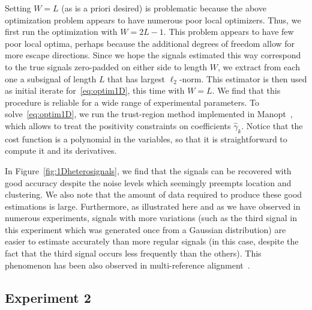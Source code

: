 \documentclass[12pt]{article}
\newcommand{\1}{\mathbf{1}}
\theoremstyle{plain}
\theoremstyle{definition}
\theoremstyle{remark}
\theoremstyle{plain}
\theoremstyle{remark}
\theoremstyle{plain}
\theoremstyle{plain}
\theoremstyle{plain}
\numberwithin{equation}{section}
\begin{document}
Setting $W = L$ (as is a priori desired) is problematic because the above optimization problem appears to have numerous poor local optimizers. Thus, we first run the optimization with $W = 2L-1$. This problem appears to have few poor local optima, perhaps because the additional degrees of freedom allow for more escape directions. Since we hope the signals estimated this way correspond to the true signals zero-padded on either side to length $W$, we extract from each one a subsignal of length $L$ that has largest $\ell_2$-norm. This estimator is then used as initial iterate for~\eqref{eq:optim1D}, this time with $W = L$. We find that this procedure is reliable for a wide range of experimental parameters. To solve~\eqref{eq:optim1D}, we run the trust-region method implemented in Manopt~\cite{manopt}, which allows to treat the positivity constraints on coefficients $\hat \gamma_k$. Notice that the cost function is a polynomial in the variables, so that it is straightforward to compute it and its derivatives.

In Figure~\ref{fig:1Dheterosignals}, we find that the signals can be recovered with good accuracy despite the noise levels which seemingly preempts location and clustering. We also note that the amount of data required to produce these good estimations is large. Furthermore, as illustrated here and as we have observed in numerous experiments, signals with more variations (such as the third signal in this experiment which was generated once from a Gaussian distribution) are easier to estimate accurately than more regular signals (in this case, despite the fact that the third signal occurs less frequently than the others).
This phenomenon has been also observed in multi-reference alignment~\cite[Section 3.2]{perry2017sample}.

\subsection{Experiment 2}
\end{document}

